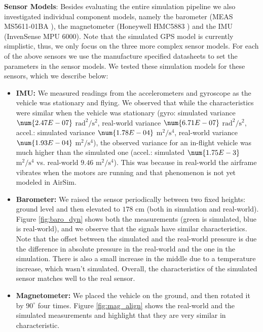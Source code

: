 \documentclass[graybox]{svmult}
\newcommand{\Name}{AirSim\xspace}
\begin{document}
\vspace{0.075in}
\noindent \textbf{Sensor Models}: Besides evaluating the entire simulation pipeline we also investigated individual component models, namely the barometer (MEAS MS5611-01BA \cite{barometer}), the magnetometer (Honeywell HMC5883 \cite{hmc5883}) and the IMU (InvenSense MPU 6000). Note that the simulated GPS model is currently simplistic, thus, we only focus on the three more complex sensor models. For each of the above sensors we use the manufacture specified datasheets to set the parameters in the sensor models. We tested these simulation models for these sensors, which we describe below:  

\begin{itemize}
\item{{\bf IMU:} We measured readings from the accelerometers and gyroscope as the vehicle was stationary and flying. We observed that while the characteristics were similar when the vehicle was stationary (gyro: simulated variance $\num{2.47E-07}$ $\mathrm{rad^2/s^2}$, real-world variance $\num{6.71E-07}$ $\mathrm{rad^2/s^2}$, accel.: simulated variance $\num{1.78E-04} $ $\mathrm{m^2/s^4}$, real-world variance $\num{1.93E-04}$ $\mathrm{m^2/s^4}$), the observed variance for an in-flight vehicle was much higher than the simulated one (accel.: simulated $\num{1.75E-3}$ $\mathrm{m^2/s^4}$ vs. real-world $\num{9.46}$ $\mathrm{m^2/s^4}$). This was because in real-world the airframe vibrates when the motors are running and that phenomenon is not yet modeled in \Name.}

\item{{\bf Barometer:} We raised the sensor periodically between two fixed heights: ground level and then elevated to $178$ cm (both in simulation and real-world). Figure \ref{fig:baro_dyn} shows both the measurements (green is simulated, blue is real-world), and we observe that the signals have similar characteristics. Note that the offset between the simulated and the real-world pressure is due the difference in absolute pressure in the real-world and the one in the simulation. There is also a small increase in the middle due to a temperature increase, which wasn't simulated. Overall, the characteristics of the simulated sensor matches well to the real sensor.}

\item{{\bf Magnetometer:} We placed the vehicle on the ground, and then rotated it by $90^{\circ}$ four times. Figure \ref{fig:mag_align} shows the real-world and the simulated measurements and highlight that they are very similar in characteristic.}
\end{itemize}
\end{document}
